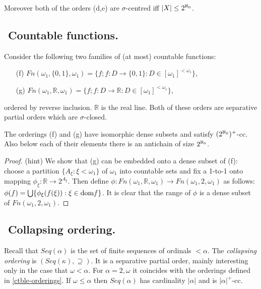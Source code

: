 Moreover both of the orders (d,e) are $\sigma$-centred iff $|X|\leq{2^{\aleph_0}}$.

\subsection{${}$ \hspace{-1em}Countable functions.}

Consider the following two families of (at most) countable functions:
\begin{itemize}
 \item[(f)]  $Fn(\omega_1,\{0,1\},\omega_1)=\{f;f:D\to\{0,1\}:D\in[\omega_1]^{<\omega_1}\}$,
 \item[(g)]  $Fn(\omega_1,{\mathbb R},\omega_1)=\{f;f:D\to{\mathbb R}:D\in[\omega_1]^{<\omega_1}\}$,
\end{itemize}
ordered by reverse inclusion. ${\mathbb R}$ is the real line.
Both of these orders are separative partial orders which are $\sigma$-closed.

\begin{proposition}
The orderings (f) and (g) have isomorphic dense subsets and satisfy $({2^{\aleph_0}})^+$-cc. Also below each of their elements there is an antichain
of size ${2^{\aleph_0}}$.
\end{proposition}
\begin{proof} (hint) We show that (g) can be embedded onto a dense subset of (f): choose a partition $\{A_\xi:\xi<\omega_1\}$ of $\omega_1$ into
countable sets and fix a 1-to-1 onto mapping $\phi_\xi:{\mathbb R}\to 2^{A_\xi}$. Then define $\phi:Fn(\omega_1,{\mathbb R},\omega_1)\to Fn(\omega_1,2,\omega_1)$ as follows: $\phi(f)=\bigcup\{ \phi_\xi(f(\xi)):\xi\in\hbox{dom} f\}$. It is clear that the range of $\phi$ is a dense subset of $Fn(\omega_1,2,\omega_1)$.
\end{proof}

\subsection{${}$ \hspace{-1em}Collapsing ordering.}

Recall that $Seq(\alpha)$ is the set of finite sequences of ordinals $<\alpha$. The \emph{collapsing ordering} is $(Seq(\kappa),\supseteq)$.
It is a separative partial order, mainly interesting only in the case that $\omega<\alpha$. For $\alpha=2,\omega$ it coincides with the orderings
defined in \ref{ctble-orderings}. If $\omega\leq\alpha$ then $Seq(\alpha)$ has cardinality $|\alpha|$ and is $|\alpha|^+$-cc.

